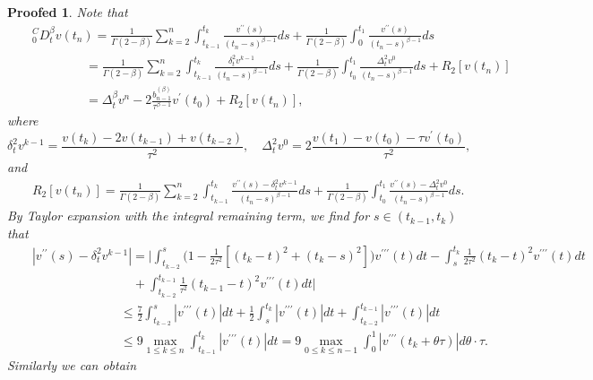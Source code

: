 \documentclass[10pt,a4paper]{amsart}
\newtheorem{proofed}{Proofed}
\begin{document}
\begin{proofed}
Note that
\begin{eqnarray}
&&_0^CD_t^{\beta}v(t_n)=\frac{1}{\Gamma{(2-\beta)} } \sum_{k=2}^n \int_{t_{k-1}}^{t_k} \frac{v^{\prime\prime}(s)}{(t_n-s)^{\beta-1}}ds +\frac{1}{\Gamma{(2-\beta)} } \int_{0}^{t_1} \frac{v^{\prime\prime}(s)}{(t_n-s)^{\beta-1}}ds\nonumber \\
&&   \qquad \qquad ~ = \frac{1}{\Gamma{(2-\beta)} } \sum_{k=2}^n \int_{t_{k-1}}^{t_k} \frac{\delta_t^2 v^{k-1}}{(t_n-s)^{\beta-1}}ds +\frac{1}{\Gamma{(2-\beta)} } \int_{t_{0}}^{t_1} \frac{\Delta_t^2v^{0}}{(t_n-s)^{\beta-1}}ds+R_2[v(t_n)] \nonumber \\
&&   \qquad \qquad~=\Delta_t^{\beta}v^n- 2  \frac{b_{n-1}^{(\beta)}}{\tau^{\beta-1}}  v^{\prime}(t_0)  +R_2[v(t_n)], \label{split-1}
\end{eqnarray}
where
$$\delta_t^2v^{k-1}=\frac{v(t_k)-2v(t_{k-1})+v(t_{k-2}) }{\tau^2},\quad \Delta_t^2v^{0}=2\frac{v(t_1)-v(t_{0})-\tau v^{\prime}(t_{0}) }{\tau^2},$$
and
\begin{eqnarray}
&&R_2[v(t_n)]= \frac{1}{\Gamma{(2-\beta)} } \sum_{k=2}^n \int_{t_{k-1}}^{t_k} \frac{v^{\prime\prime}(s)-\delta_t^2 v^{k-1}}{(t_n-s)^{\beta-1}}ds  +\frac{1}{\Gamma{(2-\beta)} }  \int_{t_{0}}^{t_1} \frac{v^{\prime\prime}(s)-\Delta_t^2 v^{0}}{(t_n-s)^{\beta-1}}ds. \label{truncation}
\end{eqnarray}
By  Taylor expansion with the integral remaining term,  we find for $s\in(t_{k-1},t_{k})$ that
\begin{eqnarray}
&& |v^{\prime\prime}(s)-\delta_t^2 v^{k-1}| = \biggl|\int^s_{t_{k-2}}\biggl(1-\frac{1}{2\tau^2}[(t_k-t)^2+(t_k-s)^2]\biggl) v^{\prime\prime\prime}(t)dt-\int_s^{t_{k}}\frac{1}{2\tau^2}(t_{k}-t)^2 v^{\prime\prime\prime}(t)dt\nonumber\\
&&\qquad\qquad\qquad\qquad +\int_{t_{k-2}}^{t_{k-1}}\frac{1}{\tau^2}(t_{k-1}-t)^2 v^{\prime\prime\prime}(t)dt \biggl|\nonumber\\
&& \qquad \qquad\qquad\quad \leq \frac{7}{2}\int^s_{t_{k-2}} |v^{\prime\prime\prime}(t)|dt+\frac{1}{2}\int_s^{t_{k}} |v^{\prime\prime\prime}(t)|dt+\int_{t_{k-2}}^{t_{k-1}} |v^{\prime\prime\prime}(t)|dt\nonumber\\
&& \qquad \qquad\qquad\quad \leq 9\max_{1\leq k\leq n}\int_{t_{k-1}}^{t_{k}} |v^{\prime\prime\prime}(t)|dt =9 \max_{0\leq k\leq n-1}\int_{0}^{1}|v^{\prime\prime\prime}(t_{k}+\theta \tau)|d\theta\cdot \tau . \label{truncation-1}
\end{eqnarray}
Similarly we can obtain
\begin{eqnarray}

\end{eqnarray}
\end{proofed}
\end{document}
